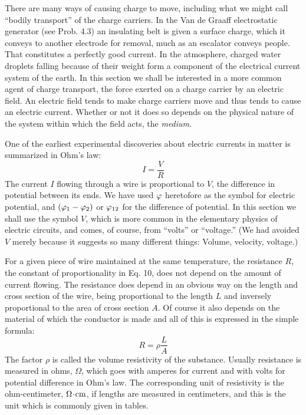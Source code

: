 There are many ways of causing charge to move, including what
we might call ``bodily transport'' of the charge carriers. In the
Van de Graaff electrostatic generator (see Prob. 4.3) an insulating
belt is given a surface charge, which it conveys to another electrode
for removal, much as an escalator conveys people. That constitutes
a perfectly good current. In the atmosphere, charged water droplets
falling because of their weight form a component of the electrical
current system of the earth. In this section we shall be interested in
a more common agent of charge transport, the force exerted on a
charge carrier by an electric field. An electric field tends to make
charge carriers move and thus tends to cause an electric current.
Whether or not it does so depends on the physical nature of the system
within which the field acts, the \emph{medium}.

One of the earliest experimental discoveries about electric currents
in matter is summarized in Ohm's law:
\begin{equation}
  I = \frac{V}{R}
\end{equation}
The current $I$ flowing through a wire is proportional to $V$, the difference
in potential between its ends. We have used $\varphi$ heretofore as
the symbol for electric potential, and $(\varphi_1-\varphi_2)$ or $\varphi_{12}$ for the difference
of potential. In this section we shall use the symbol $V$, which
is more common in the elementary physics of electric circuits, and
comes, of course, from ``volts'' or ``voltage.'' (We had avoided $V$
merely because it suggests so many different things: Volume, velocity,
voltage.)

For a given piece of wire maintained at the same temperature, the
resistance $R$, the constant of proportionality in Eq. 10, does not depend
on the amount of current flowing. The resistance does depend
in an obvious way on the length and cross section of the wire, being
proportional to the length $L$ and inversely proportional to the area
of cross section $A$. Of course it also depends on the material of
which the conductor is made and all of this is expressed in the simple
formula:
\begin{equation}
  R = \rho \frac{L}{A}
\end{equation}
The factor $\rho$ is called the volume resistivity of the substance. Usually
resistance is measured in ohms, $\Omega$, which goes with amperes for current
and with volts for potential difference in Ohm's law. The corresponding
unit of resistivity is the ohm-centimeter, $\Omega\!\cdot\!\textup{cm}$, if lengths are measured
in centimeters, and this is the unit which is commonly given in tables.

